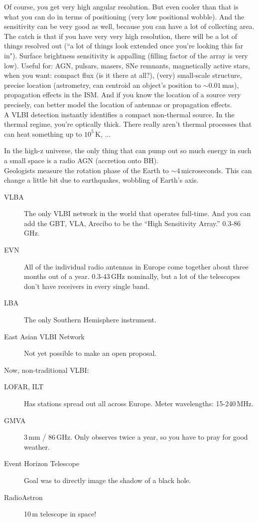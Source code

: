 \documentclass[a4paper]{article}
\begin{document}
Of course, you get very high angular resolution. But even cooler than that is what you can do in terms of positioning (very low positional wobble). And the sensitivity can be very good as well, because you can have a lot of collecting area. \\

The catch is that if you have very very high resolution, there will be a lot of things resolved out (``a lot of things look extended once you're looking this far in"). Surface brightness sensitivity is appalling (filling factor of the array is very low). Useful for: AGN, pulsars, masers, SNe remnants, magnetically active stars, when you want: compact flux (is it there at all?), (very) small-scale structure, precise location (astrometry, can centroid an object's position to $\sim 0.01$\,mas), propagation effects in the ISM. And if you know the location of a source very precisely, can better model the location of antennas or propagation effects. \\

A VLBI detection instantly identifies a compact non-thermal source. In the thermal regime, you're optically thick. There really aren't thermal processes that can heat something up to $10^5$\,K, ...

In the high-z universe, the only thing that can pump out so much energy in such a small space is a radio AGN (accretion onto BH). \\

Geologists measure the rotation phase of the Earth to $\sim 4$\,microseconds. This can change a little bit due to earthquakes, wobbling of Earth's axis. 

\begin{description}
\item[VLBA] The only VLBI network in the world that operates full-time. And you can add the GBT, VLA, Arecibo to be the ``High Sensitivity Array.'' 0.3-86\,GHz. 
\item[EVN] All of the individual radio antennas in Europe come together about three months out of a year. 0.3-43\,GHz nominally, but a lot of the telescopes don't have receivers in every single band. 
\item[LBA] The only Southern Hemisphere instrument. 
\item[East Asian VLBI Network] Not yet possible to make an open proposal. 
\end{description}

Now, non-traditional VLBI:

\begin{description}
\item[LOFAR, ILT] Has stations spread out all across Europe. Meter wavelengths: 15-240\,MHz. 
\item[GMVA] 3\,mm / 86\,GHz. Only observes twice a year, so you have to pray for good weather. 
\item[Event Horizon Telescope] Goal was to directly image the shadow of a black hole. 
\item[RadioAstron] 10\,m telescope in space! 
\end{description}
\end{document}
